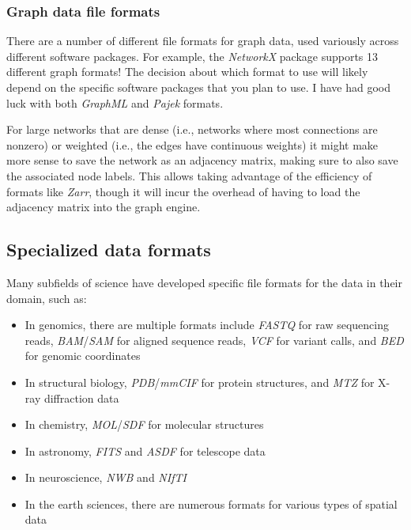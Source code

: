 \bigskip

\subsubsection{Graph data file formats}

There are a number of different file formats for graph data, used variously across different software packages.  For example, the \textit{NetworkX} package supports 13 different graph formats!  The decision about which format to use will likely depend on the specific software packages that you plan to use. I have had good luck with both \textit{GraphML} and \textit{Pajek} formats.

For large networks that are dense (i.e., networks where most connections are nonzero) or weighted (i.e., the edges have continuous weights) it might make more sense to save the network as an adjacency matrix, making sure to also save the associated node labels. This allows taking advantage of the efficiency of formats like \textit{Zarr}, though it will incur the overhead of having to load the adjacency matrix into the graph engine.

\subsection{Specialized data formats}

Many subfields of science have developed specific file formats for the data in their domain, such as:

\begin{itemize}
\item In genomics, there are multiple formats include \textit{FASTQ} for raw sequencing reads, \textit{BAM}/\textit{SAM} for aligned sequence reads, \textit{VCF} for variant calls, and \textit{BED} for genomic coordinates
\item In structural biology, \textit{PDB}/\textit{mmCIF} for protein structures, and \textit{MTZ} for X-ray diffraction data
\item In chemistry, \textit{MOL}/\textit{SDF} for molecular structures
\item In astronomy, \textit{FITS} and \textit{ASDF} for telescope data
\item In neuroscience, \textit{NWB} and \textit{NIfTI}
\item In the earth sciences, there are numerous formats for various types of spatial data
\end{itemize}

